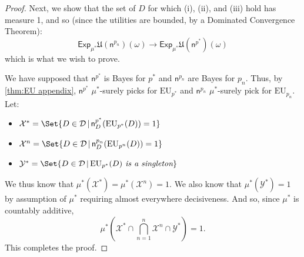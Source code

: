 \documentclass[a4paper]{article}
\newcommand\X{\mathcal{X}}
\newcommand\Y{\mathcal{Y}}
\newcommand\Exp{\mathsf{Exp}}
\newcommand\EU{\mathrm{EU}}
\newcommand\U{\mathfrak{U}} %
\newcommand{\D}{\mathcal{D}}
\newcommand{\n}{\mathsf{n}}
\newcommand\SetDelimiter[1][]{
	\nonscript\,#1\vert \allowbreak \nonscript\,\mathopen{}}
\providecommand\given{\SetDelimiter}
\newenvironment{CCM rewritten}
{\begingroup\color{blue}} %
{\endgroup}              %
\begin{document}
\begin{proof}
Next, we show that the set of $D$ for which (i), (ii), and (iii) hold has measure 1, and so (since the utilities are bounded, by a Dominated Convergence Theorem):
$$\Exp_{\mu^*}\U(\n^{p_n})(\omega) \longrightarrow \Exp_{\mu^*} \U(\n^{p^*})(\omega)$$which is what we wish to prove.

We have supposed that $\n^{p^*}$ is Bayes for $p^*$ and $\n^{p_n}$ are Bayes for $p_n$. Thus, by \cref{thm:EU appendix}, $\n^{p^*}$ ${\mu^*}$-surely picks for $\EU_{p^*}$
and $\n^{p_n}$ ${\mu^*}$-surely pick for $\EU_{p_n}$. 
Let:
\begin{itemize}
	\item $\X^* = \Set{D \in \D \given \n^{p^*}_D(\EU_{p^*}(D)) = 1 }$
	\item $\X^n = \Set{D \in \D \given \n^{p_n}_D(\EU_{p^n}(D)) = 1 }$
	\item $\Y^* = \Set{D \in \D \given \EU_{p^*}(D) \emph{ is a singleton}}$
\end{itemize}
We thus know that ${\mu^*}(\X^*) = {\mu^*}(\X^n)=1$. We also know that ${\mu^*}(\Y^*) = 1$ by assumption of ${\mu^*}$ requiring almost everywhere decisiveness. And so, since ${\mu^*}$ is countably additive,
$${\mu^*}\left (\X^* \cap \bigcap^n_{n=1} \X^n \cap \Y^* \right ) = 1.$$This completes the proof.
\end{proof}
\end{document}
